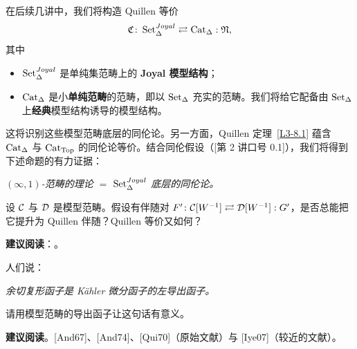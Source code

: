 \nitem\label{L3-8.5}
在后续几讲中，我们将构造 Quillen 等价
\[
\mathfrak{C}\colon\operatorname{Set}^{Joyal}_{\Delta}\rightleftarrows\operatorname{Cat}_{\Delta}:\mathfrak{N},
\]
其中
\begin{itemize}[leftmargin=2.2em,itemsep=0.1em]
\item $\operatorname{Set}^{Joyal}_{\Delta}$ 是单纯集范畴上的 \textbf{Joyal 模型结构}；
\item $\operatorname{Cat}_{\Delta}$ 是小\textbf{单纯范畴}的范畴，即以 $\operatorname{Set}_{\Delta}$ 充实的范畴。我们将给它配备由 $\operatorname{Set}_{\Delta}$ 上\textbf{经典}模型结构诱导的模型结构。
\end{itemize}
这将识别这些模型范畴底层的同伦论。另一方面，Quillen 定理~\ref{L3-8.1} 蕴含 $\operatorname{Cat}_{\Delta}$ 与 $\operatorname{Cat}_{\operatorname{Top}}$ 的同伦论等价。结合同伦假设（[第 2 讲口号 0.1]），我们将得到下述命题的有力证据：
\begin{center}
\emph{$(\infty,1)$-范畴的理论 $=$ $\operatorname{Set}^{Joyal}_{\Delta}$ 底层的同伦论。}
\end{center}


\begin{exercise}\label{L3-A.1}
设 $\mathcal{C}$ 与 $\mathcal{D}$ 是模型范畴。假设有伴随对 $F^{\prime}\colon\mathcal{C}[W^{-1}]\rightleftarrows\mathcal{D}[W^{-1}]:G^{\prime}$，是否总能把它提升为 Quillen 伴随？Quillen 等价又如何？
\end{exercise}

\nitem\label{L3-A.2}
\textbf{建议阅读}：\quad [DS09]。


\begin{exercise}\label{L3-B.1}
人们说：
\begin{center}
\emph{余切复形函子是 Kähler 微分函子的左导出函子。}
\end{center}
请用模型范畴的导出函子让这句话有意义。
\end{exercise}

\nitem\label{L3-B.2}
\textbf{建议阅读}。[And67]、[And74]、[Qui70]（原始文献）与 [Iye07]（较近的文献）。


